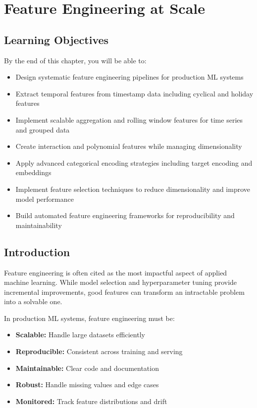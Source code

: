 \chapter{Feature Engineering at Scale}
\label{ch:feature_engineering}

\section*{Learning Objectives}

By the end of this chapter, you will be able to:

\begin{itemize}
    \item Design systematic feature engineering pipelines for production ML systems
    \item Extract temporal features from timestamp data including cyclical and holiday features
    \item Implement scalable aggregation and rolling window features for time series and grouped data
    \item Create interaction and polynomial features while managing dimensionality
    \item Apply advanced categorical encoding strategies including target encoding and embeddings
    \item Implement feature selection techniques to reduce dimensionality and improve model performance
    \item Build automated feature engineering frameworks for reproducibility and maintainability
\end{itemize}

\section{Introduction}

Feature engineering is often cited as the most impactful aspect of applied machine learning. While model selection and hyperparameter tuning provide incremental improvements, good features can transform an intractable problem into a solvable one.

In production ML systems, feature engineering must be:

\begin{itemize}
    \item \textbf{Scalable:} Handle large datasets efficiently
    \item \textbf{Reproducible:} Consistent across training and serving
    \item \textbf{Maintainable:} Clear code and documentation
    \item \textbf{Robust:} Handle missing values and edge cases
    \item \textbf{Monitored:} Track feature distributions and drift
\end{itemize}

